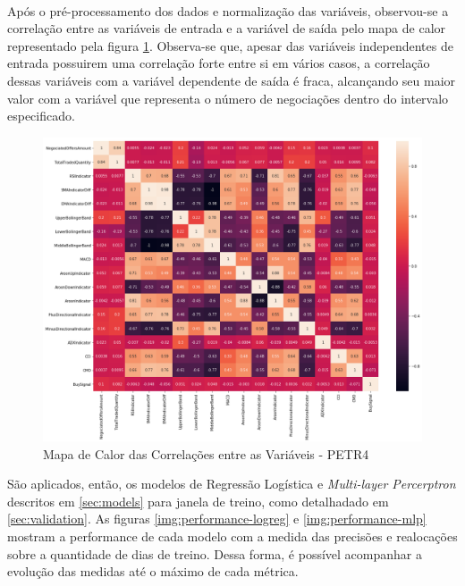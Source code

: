 \documentclass[grad,numbers]{coppe}
\begin{document}
            \paragraph{}Após o pré-processamento dos dados e normalização das variáveis, observou-se a correlação entre as variáveis de entrada e a variável de saída pelo mapa de calor representado pela figura \ref{img:heatmap}. Observa-se que, apesar das variáveis independentes de entrada possuirem uma correlação forte entre si em vários casos, a correlação dessas variáveis com a variável dependente de saída é fraca, alcançando seu maior valor com a variável que representa o número de negociações dentro do intervalo especificado. 
            
            \begin{figure}[h]
                \caption{Mapa de Calor das Correlações entre as Variáveis - PETR4}
                \label{img:heatmap}
                \includegraphics[width=15cm]{corr.png}
                \centering
            \end{figure}
            
            São aplicados, então, os modelos de Regressão Logística e \textit{Multi-layer Percerptron} descritos em \ref{sec:models} para janela de treino, como detalhadado em \ref{sec:validation}. As figuras \ref{img:performance-logreg} e \ref{img:performance-mlp} mostram a performance de cada modelo com a medida das precisões e realocações sobre a quantidade de dias de treino. Dessa forma, é possível acompanhar a evolução das medidas até o máximo de cada métrica.
            
\end{document}
